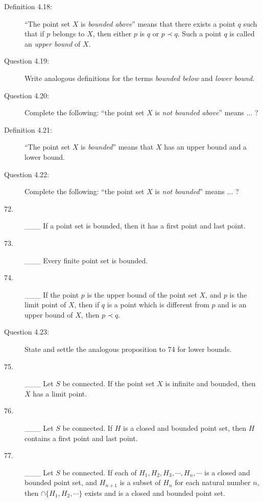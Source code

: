 \documentclass{book}
\begin{document}
\begin{description}
\item[Definition 4.18:] ``The point set $X$ is \emph{bounded above}'' means that there exists a point $q$ such that if $p$ belongs to $X$, then either $p$ is $q$ or $p \prec q$. Such a point $q$ is called an \emph{upper bound} of $X$.

\item[Question 4.19:] Write analogous definitions for the terms \emph{bounded below} and \emph{lower bound}.

\item[Question 4.20:] Complete the following: ``the point set $X$ is \emph{not bounded above}'' means ... ?

\item[Definition 4.21:] ``The point set $X$ is \emph{bounded}'' means that $X$ has an upper bound and a lower bound.

\item[Question 4.22:] Complete the following: ``the point set $X$ is \emph{not bounded}'' means ... ?

\item[72.] \_\_\_ If a point set is bounded, then it has a first point and last point.

\item[73.] \_\_\_ Every finite point set is bounded.

\item[74.] \_\_\_ If the point $p$ is the upper bound of the point set $X$, and $p$ is the limit point of $X$, then if $q$ is a point which is different from $p$ and is an upper bound of $X$, then $p \prec q$.

\item[Question 4.23:] State and settle the analogous proposition to 74 for lower bounds.

\item[75.] \_\_\_ Let $S$ be connected. If the point set $X$ is infinite and bounded, then $X$ has a limit point.

\item[76.] \_\_\_ Let $S$ be connected. If $H$ is a closed and bounded point set, then $H$ contains a first point and last point.

\item[77.] \_\_\_ Let $S$ be connected. If each of $H_{1}, H_{2}, H_{3}, \cdots, H_{n}, \cdots$ is a closed and bounded point set, and $H_{n+1}$ is a subset of $H_{n}$ for each natural number $n$, then $\cap \{ H_{1}, H_{2}, \cdots \}$ exists and is a closed and bounded point set.


\end{description}
\end{document}
